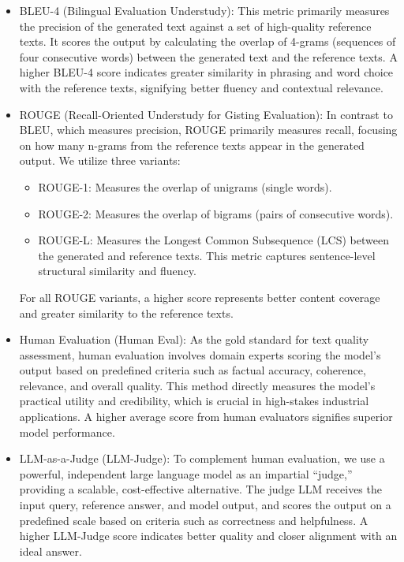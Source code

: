 \documentclass[preprint,12pt]{elsarticle}
\def\textbf#1{#1}%
\begin{document}
\begin{itemize}
    \item \textbf{BLEU-4 (Bilingual Evaluation Understudy):} This metric primarily measures the \textbf{precision} of the generated text against a set of high-quality reference texts. It scores the output by calculating the overlap of \textbf{4-grams} (sequences of four consecutive words) between the generated text and the reference texts. A higher BLEU-4 score indicates greater similarity in phrasing and word choice with the reference texts, signifying better fluency and contextual relevance.

    \item \textbf{ROUGE (Recall-Oriented Understudy for Gisting Evaluation):} In contrast to BLEU, which measures precision, ROUGE primarily measures \textbf{recall}, focusing on how many n-grams from the reference texts appear in the generated output. We utilize three variants:
    \begin{itemize}
        \item \textbf{ROUGE-1:} Measures the overlap of \textbf{unigrams} (single words).
        \item \textbf{ROUGE-2:} Measures the overlap of \textbf{bigrams} (pairs of consecutive words).
        \item \textbf{ROUGE-L:} Measures the Longest Common Subsequence (LCS) between the generated and reference texts. This metric captures sentence-level structural similarity and fluency.
    \end{itemize}
    For all ROUGE variants, a higher score represents better content coverage and greater similarity to the reference texts.

    \item \textbf{Human Evaluation (Human Eval)\cite{smith2022humanevaluationconversationsopen}:} As the gold standard for text quality assessment, human evaluation involves domain experts scoring the model's output based on predefined criteria such as factual accuracy, coherence, relevance, and overall quality. This method directly measures the model's practical utility and credibility, which is crucial in high-stakes industrial applications. A higher average score from human evaluators signifies superior model performance.

    \item \textbf{LLM-as-a-Judge (LLM-Judge)\cite{zheng2023judgingllmasajudgemtbenchchatbot}:} To complement human evaluation, we use a powerful, independent large language model as an impartial “judge,” providing a scalable, cost-effective alternative. The judge LLM receives the input query, reference answer, and model output, and scores the output on a predefined scale based on criteria such as correctness and helpfulness. A higher LLM-Judge score indicates better quality and closer alignment with an ideal answer.
\end{itemize}
\end{document}
